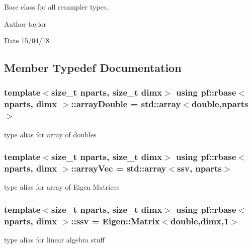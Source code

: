 Base class for all resampler types. 

\begin{DoxyAuthor}{Author}
taylor 
\end{DoxyAuthor}
\begin{DoxyDate}{Date}
15/04/18 
\end{DoxyDate}


\subsection{Member Typedef Documentation}
\subsubsection[{\texorpdfstring{array\+Double}{arrayDouble}}]{\setlength{\rightskip}{0pt plus 5cm}template$<$size\+\_\+t nparts, size\+\_\+t dimx$>$ using {\bf pf\+::rbase}$<$ nparts, dimx $>$\+::{\bf array\+Double} =  std\+::array$<$double,nparts$>$}\hypertarget{classpf_1_1rbase_a37b2d02d00f75d9550122b763cbb3fed}{}\label{classpf_1_1rbase_a37b2d02d00f75d9550122b763cbb3fed}
type alias for array of doubles 
\subsubsection[{\texorpdfstring{array\+Vec}{arrayVec}}]{\setlength{\rightskip}{0pt plus 5cm}template$<$size\+\_\+t nparts, size\+\_\+t dimx$>$ using {\bf pf\+::rbase}$<$ nparts, dimx $>$\+::{\bf array\+Vec} =  std\+::array$<${\bf ssv}, nparts$>$}\hypertarget{classpf_1_1rbase_a89951bb3872c1c6a0c3da0962a9aaa13}{}\label{classpf_1_1rbase_a89951bb3872c1c6a0c3da0962a9aaa13}
type alias for array of Eigen Matrices 
\subsubsection[{\texorpdfstring{ssv}{ssv}}]{\setlength{\rightskip}{0pt plus 5cm}template$<$size\+\_\+t nparts, size\+\_\+t dimx$>$ using {\bf pf\+::rbase}$<$ nparts, dimx $>$\+::{\bf ssv} =  Eigen\+::\+Matrix$<$double,dimx,1$>$}\hypertarget{classpf_1_1rbase_a47a4bdc0e3c08b72ce4f24a18d5b0e04}{}\label{classpf_1_1rbase_a47a4bdc0e3c08b72ce4f24a18d5b0e04}
type alias for linear algebra stuff 

